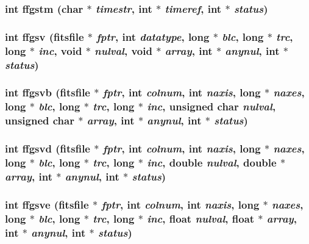 \subsubsection{\setlength{\rightskip}{0pt plus 5cm}int ffgstm (char $\ast$ {\em timestr}, int $\ast$ {\em timeref}, int $\ast$ {\em status})}\label{fitsio_8h_261640d215b78ccc9368b45915b4b199}


\subsubsection{\setlength{\rightskip}{0pt plus 5cm}int ffgsv (\bf{fitsfile} $\ast$ {\em fptr}, int {\em datatype}, long $\ast$ {\em blc}, long $\ast$ {\em trc}, long $\ast$ {\em inc}, void $\ast$ {\em nulval}, void $\ast$ {\em array}, int $\ast$ {\em anynul}, int $\ast$ {\em status})}\label{fitsio_8h_caeaf7b359e9abbf70e7e912e14329fa}


\subsubsection{\setlength{\rightskip}{0pt plus 5cm}int ffgsvb (\bf{fitsfile} $\ast$ {\em fptr}, int {\em colnum}, int {\em naxis}, long $\ast$ {\em naxes}, long $\ast$ {\em blc}, long $\ast$ {\em trc}, long $\ast$ {\em inc}, unsigned char {\em nulval}, unsigned char $\ast$ {\em array}, int $\ast$ {\em anynul}, int $\ast$ {\em status})}\label{fitsio_8h_83da0d68b492ed457e64f01e1dfad807}


\subsubsection{\setlength{\rightskip}{0pt plus 5cm}int ffgsvd (\bf{fitsfile} $\ast$ {\em fptr}, int {\em colnum}, int {\em naxis}, long $\ast$ {\em naxes}, long $\ast$ {\em blc}, long $\ast$ {\em trc}, long $\ast$ {\em inc}, double {\em nulval}, double $\ast$ {\em array}, int $\ast$ {\em anynul}, int $\ast$ {\em status})}\label{fitsio_8h_d7a1005a5c7e8f1f436eac3d8e5d837d}


\subsubsection{\setlength{\rightskip}{0pt plus 5cm}int ffgsve (\bf{fitsfile} $\ast$ {\em fptr}, int {\em colnum}, int {\em naxis}, long $\ast$ {\em naxes}, long $\ast$ {\em blc}, long $\ast$ {\em trc}, long $\ast$ {\em inc}, float {\em nulval}, float $\ast$ {\em array}, int $\ast$ {\em anynul}, int $\ast$ {\em status})}\label{fitsio_8h_caea21eb62f053c04e29d9fe6706e7ee}


